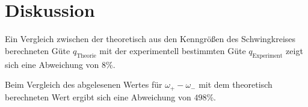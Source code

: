 \section{Diskussion}
\label{sec:Diskussion}
Ein Vergleich zwischen der theoretisch aus den Kenngrößen des Schwingkreises berechneten Güte $q_\mathrm{Theorie}$ mit der experimentell bestimmten Güte $q_\mathrm{Experiment}$ zeigt sich eine Abweichung von $8\%$.

Beim Vergleich des abgelesenen Wertes für $\omega_+ - \omega_-$ mit dem theoretisch berechneten Wert ergibt sich eine Abweichung von $ 498 \%$.
